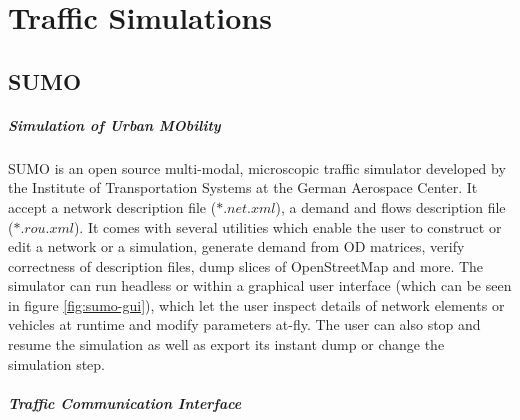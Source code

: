 \chapter{Traffic Simulations}

\section{SUMO}

\paragraph{\textbf{S}imulation of \textbf{U}rban \textbf{MO}bility}

SUMO is an open source multi-modal, microscopic traffic simulator developed by the Institute of Transportation Systems at the German Aerospace Center. It accept a network description file ($*.net.xml$), a demand and flows description file ($*.rou.xml$). It comes with several utilities which enable the user to construct or edit a network or a simulation, generate demand from OD matrices, verify correctness of description files, dump slices of OpenStreetMap and more. The simulator can run headless or within a graphical user interface (which can be seen in figure \ref{fig:sumo-gui}), which let the user inspect details of network elements or vehicles at runtime and modify parameters at-fly. The user can also stop and resume the simulation as well as export its instant dump or change the simulation step.


\paragraph{\textbf{T}raffic \textbf{C}ommunication \textbf{I}nterface}


